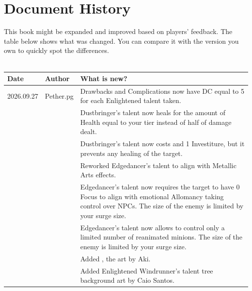 \onecolumn
\section{Document History}

This book might be expanded and improved based on players' feedback. The table below shows what was changed. You can compare it with the version you own to quickly spot the differences. \\ \\
\small
\begin{tabular}{p{1.7cm} p{1.7cm} p{13cm}}
	
	Date & Author & What is new? \\ \hline
	
	\color{black} 2026.09.27
	& \color{black} Pether.pg
	& \color{black} Drawbacks and Complications now have DC equal to 5 for each Enlightened talent taken. \\
	
	&& \color{black} Dustbringer's \talentDustbringerLifestealName{} talent now heals for the amount of Health equal to your tier instead of half of damage dealt. \\
	
	&& \color{black} Dustbringer's \talentDustbringerUnhealableName{} talent now costs \iconAction{} and 1 Investiture, but it prevents any healing of the target. \\
	
	&& \color{black} Reworked Edgedancer's \talentEdgedancerEnhanceName{} talent to align with Metallic Arts effects. \\
	
	&& \color{black} Edgedancer's \talentEdgedancerPuppeteerName{} talent now requires the target to have 0 Focus to align with emotional Allomancy taking control over NPCs. The size of the enemy is limited by your surge size. \\
	
	&& \color{black} Edgedancer's \talentEdgedancerReanimateName{} talent now allows to control only a limited number of reanimated minions. The size of the enemy is limited by your surge size. \\
	
	&& Added \npcSjaAnat{}, the \npcSjaAnatTitle{} art by Aki. \\
	
	&& \color{black} Added Enlightened Windrunner's talent tree background art by Caio Santos. \\ 
	

\end{tabular}
